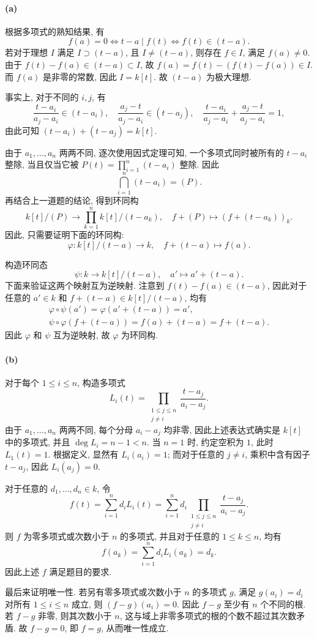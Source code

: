 \documentclass{article}
\begin{document}
\begin{solution}
	\paragraph{(a)} 根据多项式的熟知结果, 有
	\[ f(a) = 0 \Longleftrightarrow t-a \mid f(t) \Longleftrightarrow f(t) \in (t-a). \]
	若对于理想 $I$ 满足 $I \supset (t - a)$, 且 $I \neq (t-a)$, 则存在 $f \in I$, 满足 $f(a) \neq 0$. 由于 $f(t) - f(a) \in (t-a) \subset I$, 故 $f(a) = f(t) - (f(t) - f(a)) \in I$. 而 $f(a)$ 是非零的常数, 因此 $I = k[t]$. 故 $(t-a)$ 为极大理想.

	事实上, 对于不同的 $i, j$, 有
	\[ \frac{t - a_i}{a_j - a_i} \in (t - a_i), \quad \frac{a_j - t}{a_j - a_i} \in (t - a_j), \quad \frac{t - a_i}{a_j - a_i} + \frac{a_j - t}{a_j - a_i} = 1, \]
	由此可知 $(t - a_i) + (t - a_j) = k[t]$.

	由于 $a_1, \dots, a_n$ 两两不同, 逐次使用因式定理可知, 一个多项式同时被所有的 $t-a_i$ 整除, 当且仅当它被 $P(t) = \prod_{i=1}^{n}(t-a_i)$ 整除. 因此
	\[ \bigcap_{i=1}^{n}(t-a_i) = (P). \]
	再结合上一道题的结论, 得到环同构
	\[ k[t]/(P) \to \prod_{k=1}^{n}k[t]/(t - a_k), \quad f + (P) \mapsto (f + (t - a_k))_{k}. \]
	因此, 只需要证明下面的环同构:
	\[ \varphi: k[t]/(t - a) \to k, \quad f + (t - a) \mapsto f(a). \]

	构造环同态
	\[ \psi: k \to k[t]/(t - a), \quad a' \mapsto a' + (t - a). \]
	下面来验证这两个映射互为逆映射. 注意到 $f(t) - f(a) \in (t-a)$, 因此对于任意的 $a' \in k$ 和 $f + (t-a) \in k[t]/(t-a)$, 均有
	\begin{gather*}
		\varphi \circ \psi(a') = \varphi(a'+(t-a)) = a',\\
		\psi \circ \varphi(f+(t-a)) = f(a)+(t-a) = f+(t-a).
	\end{gather*}
	因此 $\varphi$ 和 $\psi$ 互为逆映射, 故 $\varphi$ 为环同构.

	\paragraph{(b)} 对于每个 $1 \le i \le n$, 构造多项式
	\[ L_i(t) = \prod_{\substack{1 \le j \le n \\ j \neq i}} \frac{t-a_j}{a_i-a_j}. \]
	由于 $a_1, \dots, a_n$ 两两不同, 每个分母 $a_i-a_j$ 均非零, 因此上述表达式确实是 $k[t]$ 中的多项式, 并且 $\deg L_i = n-1 < n$. 当 $n = 1$ 时, 约定空积为 $1$, 此时 $L_1(t) = 1$. 根据定义, 显然有 $L_i(a_i) = 1$; 而对于任意的 $j \neq i$, 乘积中含有因子 $t-a_j$, 因此 $L_i(a_j) = 0$.

	对于任意的 $d_1, \dots, d_n \in k$, 令
	\[ f(t) = \sum_{i=1}^{n} d_i L_i(t) = \sum_{i=1}^{n} d_i \prod_{\substack{1 \le j \le n \\ j \neq i}} \frac{t-a_j}{a_i-a_j}. \]
	则 $f$ 为零多项式或次数小于 $n$ 的多项式, 并且对于任意的 $1 \le k \le n$, 均有
	\[ f(a_k) = \sum_{i=1}^{n} d_i L_i(a_k) = d_k. \]
	因此上述 $f$ 满足题目的要求.

	最后来证明唯一性. 若另有零多项式或次数小于 $n$ 的多项式 $g$, 满足 $g(a_i) = d_i$ 对所有 $1 \le i \le n$ 成立, 则 $(f-g)(a_i) = 0$. 因此 $f-g$ 至少有 $n$ 个不同的根. 若 $f-g$ 非零, 则其次数小于 $n$, 这与域上非零多项式的根的个数不超过其次数矛盾. 故 $f-g = 0$, 即 $f = g$, 从而唯一性成立.
\end{solution}
\end{document}
